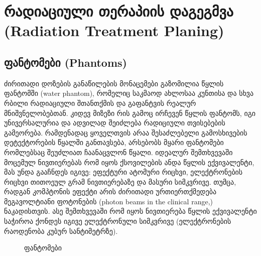 \documentclass[12pt,a4paper,]{report}
\begin{document}
\chapter{რადიაციული თერაპიის დაგეგმვა (Radiation Treatment Planing)}
\section{ფანტომები (Phantoms)}
ძირითადი დოზების განაწილების მონაცემები გაზომილია წყლის ფანტომში (water phantom), რომელიც საკმაოდ ახლოსაა კუნთისა და სხვა რბილი რადიაციული შთანთქმის და გაფანტვის რეალურ მნიშვნელობებთან. კიდევ მიზეზი რის გამოც ირჩევენ წყლის ფანტომს, იგი უნივერსალურია და ადვილად შეიძლება რადიციული თვისებების გამეორება. რამდენადაც ყოველთვის არაა შესაძლებელი გამოსხივების დეტექტორების წყალში განთავსება, არსებობს მყარი ფანტომები რომლებსაც შეუძლიათ ჩაანაცვლონ წყალი. იდეალურ შემთხვევაში მოცემულ ნივთიერებას რომ იყოს ქსოვილების ანდა წყლის ექვივალენტი, მას უნდა გააჩნდეს იგივე: ეფექტური ატომური რიცხვი, ელექტრონების რიცხვი თითოეულ გრამ ნივთიერებაზე და მასური სიმკვრივე. თუმცა, რადგან კომპტონის ეფექტი არის ძირითადი ურთიერთქმედება მეგავოლტიანი ფოტონების (photon beams in the clinical range,) ნაკადისთვის. ასე შემთხვევაში რომ იყოს ნივთიერება წყლის ექვივალენტი საჭიროა ქონდეს იგივე ელექტრონული სიმკვრივე (ელექტრონების რაოდენობა კუბურ სანტიმეტრზე).

	\begin{figure}[h]%
    	\centering
    	\qquad
    	\caption{ფანტომები}%
    	\label{fig:phantom}%
	\end{figure}
\end{document}
